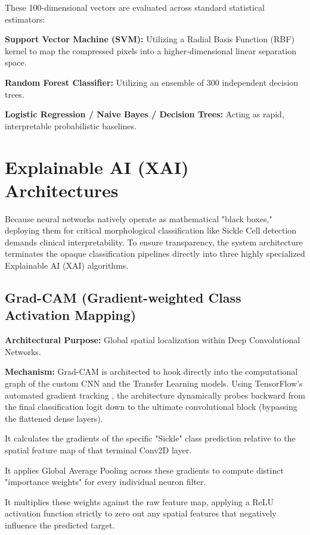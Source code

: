 These 100-dimensional vectors are evaluated across standard statistical estimators:

\noindent\textbf{Support Vector Machine (SVM):} Utilizing a Radial Basis Function (RBF) kernel to map the compressed pixels into a higher-dimensional linear separation space.

\noindent\textbf{Random Forest Classifier:} Utilizing an ensemble of 300 independent decision trees.

\noindent\textbf{Logistic Regression / Naive Bayes / Decision Trees:} Acting as rapid, interpretable probabilistic baselines.

\section{Explainable AI (XAI) Architectures}

Because neural networks natively operate as mathematical "black boxes," deploying them for critical morphological classification like Sickle Cell detection demands clinical interpretability. To ensure transparency, the system architecture terminates the opaque classification pipelines directly into three highly specialized Explainable AI (XAI) algorithms.

\subsection{Grad-CAM (Gradient-weighted Class Activation Mapping)}

\noindent\textbf{Architectural Purpose:} Global spatial localization within Deep Convolutional Networks.

\noindent\textbf{Mechanism:} Grad-CAM is architected to hook directly into the computational graph of the custom CNN and the Transfer Learning models. Using TensorFlow's automated gradient tracking , the architecture dynamically probes backward from the final classification logit down to the ultimate convolutional block (bypassing the flattened dense layers).

It calculates the gradients of the specific "Sickle" class prediction relative to the spatial feature map of that terminal Conv2D layer.

It applies Global Average Pooling across these gradients to compute distinct "importance weights" for every individual neuron filter.

It multiplies these weights against the raw feature map, applying a ReLU activation function strictly to zero out any spatial features that negatively influence the predicted target.


